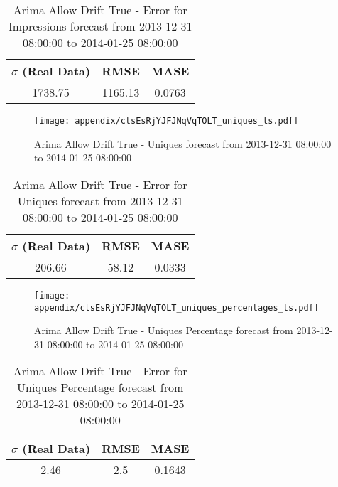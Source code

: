 \begin{table}[H]
\centering
\footnotesize
\begin{tabular}{ccc}
$\sigma$ (Real Data) & RMSE & MASE   \\ \hline
1738.75 & 1165.13 & 0.0763 \\
\end{tabular}

\vspace{0.5cm}

\caption{
Arima Allow Drift True - Error for Impressions forecast from 2013-12-31 08:00:00 to 2014-01-25 08:00:00}
\end{table}

\begin{figure}[H] \begin{center} \leavevmode
\texttt{[image: appendix/ctsEsRjYJFJNqVqTOLT\_uniques\_ts.pdf]} \caption{
Arima Allow Drift True - Uniques forecast from 2013-12-31 08:00:00 to 2014-01-25 08:00:00} \label{fig:appendix/ctsEsRjYJFJNqVqTOLT_uniques_ts.pdf} \end{center}
\end{figure}

\begin{table}[H]
\centering
\footnotesize
\begin{tabular}{ccc}
$\sigma$ (Real Data) & RMSE & MASE   \\ \hline
206.66 & 58.12 & 0.0333 \\
\end{tabular}

\vspace{0.5cm}

\caption{
Arima Allow Drift True - Error for Uniques forecast from 2013-12-31 08:00:00 to 2014-01-25 08:00:00}
\end{table}

\begin{figure}[H] \begin{center} \leavevmode
\texttt{[image: appendix/ctsEsRjYJFJNqVqTOLT\_uniques\_percentages\_ts.pdf]} \caption{
Arima Allow Drift True - Uniques Percentage forecast from 2013-12-31 08:00:00 to 2014-01-25 08:00:00} \label{fig:appendix/ctsEsRjYJFJNqVqTOLT_uniques_percentages_ts.pdf} \end{center}
\end{figure}

\begin{table}[H]
\centering
\footnotesize
\begin{tabular}{ccc}
$\sigma$ (Real Data) & RMSE & MASE   \\ \hline
2.46 & 2.5 & 0.1643 \\
\end{tabular}

\vspace{0.5cm}

\caption{
Arima Allow Drift True - Error for Uniques Percentage forecast from 2013-12-31 08:00:00 to 2014-01-25 08:00:00}
\end{table}

